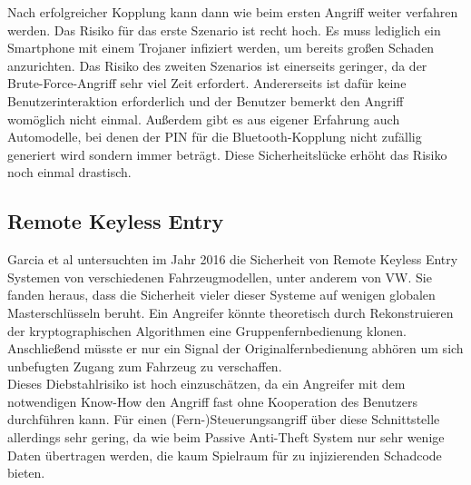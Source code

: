 Nach erfolgreicher Kopplung kann dann wie beim ersten Angriff weiter verfahren werden. 
Das Risiko für das erste Szenario ist recht hoch. Es muss lediglich ein Smartphone mit einem Trojaner infiziert werden, um bereits großen Schaden anzurichten. Das Risiko des zweiten Szenarios ist einerseits geringer, da der Brute-Force-Angriff sehr viel Zeit erfordert. Andererseits ist dafür keine Benutzerinteraktion erforderlich und der Benutzer bemerkt den Angriff womöglich nicht einmal. Außerdem gibt es aus eigener Erfahrung auch Automodelle, bei denen der PIN für die Bluetooth-Kopplung nicht zufällig generiert wird sondern immer \grqq{} beträgt. Diese Sicherheitslücke erhöht das Risiko noch einmal drastisch.


\subsection{Remote Keyless Entry}
Garcia et al untersuchten im Jahr 2016 die Sicherheit von Remote Keyless Entry Systemen von verschiedenen Fahrzeugmodellen, unter anderem von VW. Sie fanden heraus, dass die Sicherheit vieler dieser Systeme auf wenigen globalen Masterschlüsseln beruht. Ein Angreifer könnte theoretisch durch Rekonstruieren der kryptographischen Algorithmen eine Gruppenfernbedienung klonen. Anschließend müsste er nur ein Signal der Originalfernbedienung abhören um sich unbefugten Zugang zum Fahrzeug zu verschaffen. \cite{Garcia.2016}\\
Dieses Diebstahlrisiko ist hoch einzuschätzen, da ein Angreifer mit dem notwendigen Know-How den Angriff fast ohne Kooperation des Benutzers durchführen kann. Für einen (Fern-)Steuerungsangriff über diese Schnittstelle allerdings sehr gering, da wie beim Passive Anti-Theft System nur sehr wenige Daten übertragen werden, die kaum Spielraum für zu injizierenden Schadcode bieten.

